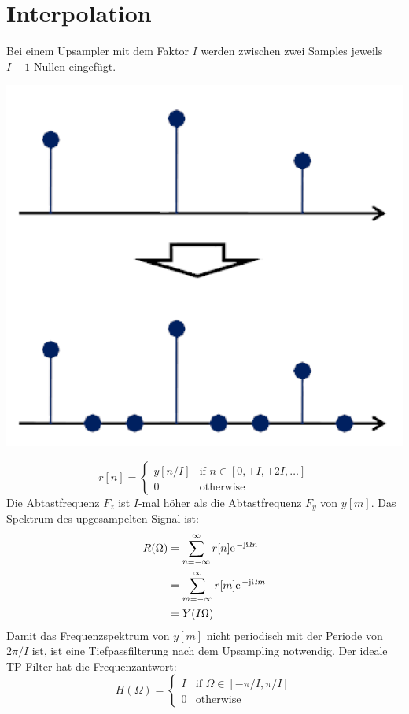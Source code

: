 \section{Interpolation}
Bei einem Upsampler mit dem Faktor $I$ werden zwischen zwei Samples jeweils
$I-1$ Nullen eingefügt.
\begin{center}
	\includegraphics[scale=.7]{../fig/upsample}
\end{center}
\[ r[n] = \left\lbrace \begin{matrix}
	y[n/I] & \textrm{if } n \in [0,\pm I, \pm 2I,\ldots]\\
	0 & \textrm{otherwise}
\end{matrix} \right. \] 
Die Abtastfrequenz $F_z$ ist $I$-mal höher als die Abtastfrequenz $F_y$ von
$y[m]$. Das Spektrum des upgesampelten Signal ist:
\[ \begin{aligned} R(\Omega) &= \sum_{n=-\infty}^{\infty} r[n]
	\e^{-\im\Omega n} \\
	&= \sum_{m=-\infty}^{\infty} r[m]\e^{-\im\Omega m}\\
	&= Y(I\Omega)  \end{aligned} \]
Damit das Frequenzspektrum von $y[m]$ nicht periodisch mit der Periode
von $2\pi/I$ ist, ist eine Tiefpassfilterung nach dem Upsampling notwendig. Der
ideale TP-Filter hat die Frequenzantwort:
\[ H(\Omega) = \left\lbrace \begin{matrix}
	I & \textrm{if } \Omega \in [-\pi/I,\pi/I]\\
	0 & \textrm{otherwise}
	\end{matrix} \right. \]
